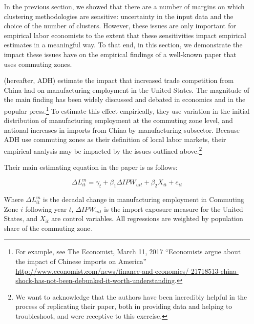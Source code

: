 In the previous section, we showed that there are a number of margins on which clustering methodologies are sensitive:  uncertainty in the input data and the choice of the number of clusters. However, these issues are only important for empirical labor economists to the extent that these
sensitivities impact empirical estimates in a meaningful way. To that end, in this section, we demonstrate the impact these issues have on the empirical findings of a well-known paper that uses commuting zones.

\citet{ADH2013} (hereafter, ADH) estimate the impact that increased trade competition from China had on manufacturing employment in the United States. The magnitude of the main finding has been widely discussed and debated in economics and in the popular press.\footnote{For example, see The Economist, March 11, 2017 ``Economists argue about the impact of Chinese imports on America'' \url{http://www.economist.com/news/finance-and-economics/ 21718513-china-shock-has-not-been-debunked-it-worth-understanding}.} To estimate this effect empirically, they use variation in the initial distribution of manufacturing employment at the commuting zone level, and national increases in imports from China by manufacturing subsector. Because ADH use commuting zones as their definition of local labor markets, their empirical analysis may be impacted by the issues outlined above.\footnote{We want to acknowledge that the authors have been incredibly helpful in the process of replicating their paper, both in providing data and helping to troubleshoot, and were receptive to this exercise.}

Their main estimating equation in the paper is as follows:

\begin{equation}\label{eqn:adh}
\Delta L_{it}^m = \gamma_t + \beta_1 \Delta IPW_{uit} + \beta_2 X_{it} + e_{it}
\end{equation}

Where $\Delta L_{it}^m$ is the decadal change in manufacturing employment in Commuting Zone $i$ following year $t$, $\Delta IPW_{uit}$ is the import exposure measure for the United States, and $X_{it}$ are control variables. All regressions are weighted by population share of the commuting zone.

